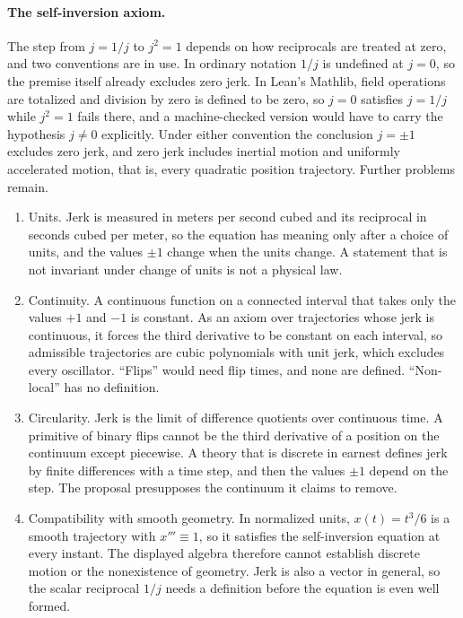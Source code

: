 \documentclass[11pt]{article}
\begin{document}
\paragraph{The self-inversion axiom.} The step from $j=1/j$ to $j^2=1$ depends on how reciprocals are treated at zero, and two conventions are in use. In ordinary notation $1/j$ is undefined at $j=0$, so the premise itself already excludes zero jerk. In Lean's Mathlib, field operations are totalized and division by zero is defined to be zero, so $j=0$ satisfies $j=1/j$ while $j^2=1$ fails there, and a machine-checked version would have to carry the hypothesis $j\neq0$ explicitly. Under either convention the conclusion $j=\pm1$ excludes zero jerk, and zero jerk includes inertial motion and uniformly accelerated motion, that is, every quadratic position trajectory. Further problems remain.
\begin{enumerate}[label=(\roman*), leftmargin=2.5em]
\item Units. Jerk is measured in meters per second cubed and its reciprocal in seconds cubed per meter, so the equation has meaning only after a choice of units, and the values $\pm1$ change when the units change. A statement that is not invariant under change of units is not a physical law.
\item Continuity. A continuous function on a connected interval that takes only the values $+1$ and $-1$ is constant. As an axiom over trajectories whose jerk is continuous, it forces the third derivative to be constant on each interval, so admissible trajectories are cubic polynomials with unit jerk, which excludes every oscillator. ``Flips'' would need flip times, and none are defined. ``Non-local'' has no definition.
\item Circularity. Jerk is the limit of difference quotients over continuous time. A primitive of binary flips cannot be the third derivative of a position on the continuum except piecewise. A theory that is discrete in earnest defines jerk by finite differences with a time step, and then the values $\pm1$ depend on the step. The proposal presupposes the continuum it claims to remove.
\item Compatibility with smooth geometry. In normalized units, $x(t)=t^3/6$ is a smooth trajectory with $x'''\equiv1$, so it satisfies the self-inversion equation at every instant. The displayed algebra therefore cannot establish discrete motion or the nonexistence of geometry. Jerk is also a vector in general, so the scalar reciprocal $1/j$ needs a definition before the equation is even well formed.
\end{enumerate}
\end{document}
